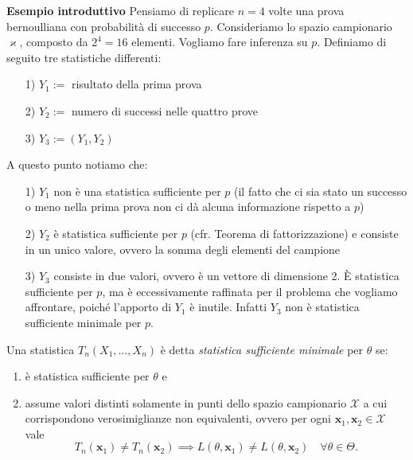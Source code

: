 \textbf{Esempio introduttivo} Pensiamo di replicare $n=4$ volte una prova bernoulliana con probabilità di successo $p$. Consideriamo lo spazio campionario $\varkappa$, composto da $2^4=16$ elementi. Vogliamo fare inferenza su $p$. Definiamo di seguito tre statistiche differenti:

\begin{enumerate}
\item [1)] $Y_1 := $ risultato della prima prova
\item [2)] $Y_2 := $ numero di successi nelle quattro prove
\item [3)] $Y_3 := (Y_1,Y_2)$
\end{enumerate}

A questo punto notiamo che:

\begin{enumerate}
\item [1)] $Y_1$ non è una statistica sufficiente per $p$ (il fatto che ci sia stato un successo o meno nella prima prova non ci dà alcuna informazione rispetto a $p$)
\item [2)] $Y_2$ è statistica sufficiente per $p$ (cfr. Teorema di fattorizzazione) e consiste in un unico valore, ovvero la somma degli elementi del campione
\item [3)] $Y_3$ consiste in due valori, ovvero è un vettore di dimensione 2. È statistica sufficiente per $p$, ma è eccessivamente raffinata per il problema che vogliamo affrontare, poiché l'apporto di $Y_1$ è inutile. Infatti $Y_3$ non è statistica sufficiente minimale per $p$.
\end{enumerate}

\begin{dfn}
Una statistica \(T_n(X_1,\dotsc,X_n)\) è detta \emph{statistica sufficiente minimale} per \(\theta\) se:
\begin{enumerate}
\item è statistica sufficiente per \(\theta\) e
\item assume valori distinti solamente in punti dello spazio campionario \(\mathcal{X}\) a cui corrispondono verosimiglianze non equivalenti, ovvero per ogni \(\mathbf{x}_1, \mathbf{x}_2 \in \mathcal{X}\) vale 
\begin{equation}
  T_n(\mathbf{x}_1) \ne T_n(\mathbf{x}_2) \implies
  L(\theta, \mathbf{x}_1) \ne L(\theta, \mathbf{x}_2) \quad \forall \theta \in \Theta.
\end{equation}
\end{enumerate}
\end{dfn}

